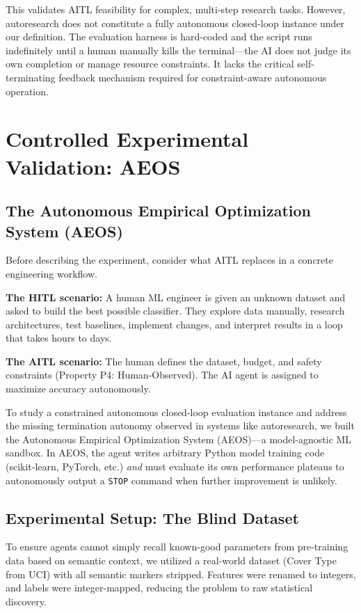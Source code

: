 \documentclass[11pt]{article}
\begin{document}
This validates AITL feasibility for complex, multi-step research tasks. However, autoresearch does not constitute a fully autonomous closed-loop instance under our definition. The evaluation harness is hard-coded and the script runs indefinitely until a human manually kills the terminal---the AI does not judge its own completion or manage resource constraints. It lacks the critical self-terminating feedback mechanism required for constraint-aware autonomous operation.

\section{Controlled Experimental Validation: AEOS}
\label{sec:aeos}

\subsection{The Autonomous Empirical Optimization System (AEOS)}

Before describing the experiment, consider what AITL replaces in a concrete engineering workflow.

\textbf{The HITL scenario:} A human ML engineer is given an unknown dataset and asked to build the best possible classifier. They explore data manually, research architectures, test baselines, implement changes, and interpret results in a loop that takes hours to days.

\textbf{The AITL scenario:} The human defines the dataset, budget, and safety constraints (Property P4: Human-Observed). The AI agent is assigned to maximize accuracy autonomously.

To study a constrained autonomous closed-loop evaluation instance and address the missing termination autonomy observed in systems like autoresearch, we built the Autonomous Empirical Optimization System (AEOS)---a model-agnostic ML sandbox. In AEOS, the agent writes arbitrary Python model training code (scikit-learn, PyTorch, etc.) \emph{and} must evaluate its own performance plateaus to autonomously output a \texttt{STOP} command when further improvement is unlikely.

\subsection{Experimental Setup: The Blind Dataset}

To ensure agents cannot simply recall known-good parameters from pre-training data based on semantic context, we utilized a real-world dataset (Cover Type from UCI) with all semantic markers stripped. Features were renamed to integers, and labels were integer-mapped, reducing the problem to raw statistical discovery.
\end{document}
